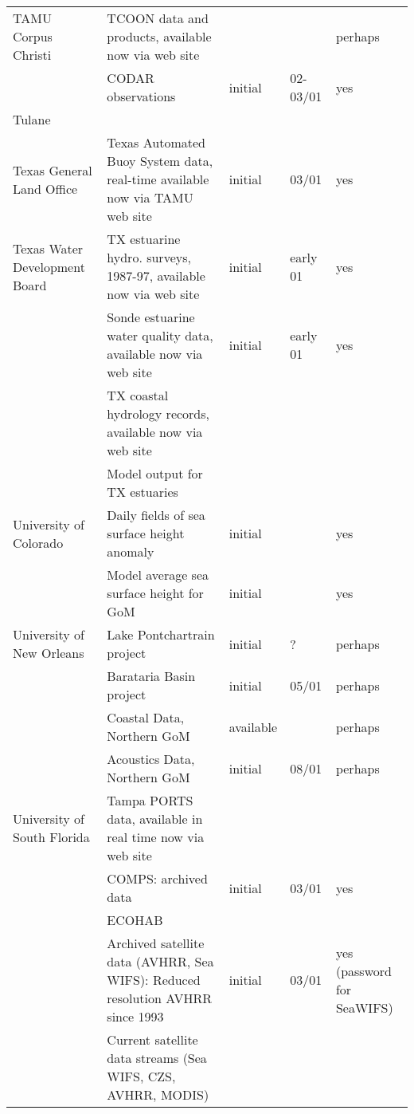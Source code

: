 \begin{longtable}{|p{0.75in}|p{2.75in}|p{0.5in}|p{0.5in}|p{0.5in}|}
TAMU Corpus Christi &  TCOON data and products,
      available now via web site & & & perhaps \\
&             CODAR observations   &          initial &     02-03/01 &
      yes \\ \hline

Tulane & & & & \\ \hline

Texas General 
Land Office    
&
Texas Automated Buoy System  data, real-time available 
                now via TAMU web site

& initial  &     03/01 &    yes \\ \hline

Texas Water Development Board
&
  TX estuarine hydro. surveys,   
    1987-97, available now via 
          web site 
& initial &     early 01  & yes \\ 
&             Sonde estuarine water quality 
               data, available  now via web 
               site 
& initial &     early 01  & yes \\ 
&             TX coastal hydrology records, 
               available now via web site & & & \\
&             Model output for TX estuaries & & & \\ \hline
University of Colorado  &  Daily fields of sea surface   
    height anomaly & initial & & yes \\
&             Model average sea surface height for GoM & initial & &
yes \\ \hline
               

University   
of New       
Orleans &     
Lake Pontchartrain project  &   initial  &     ?    & perhaps \\             
&Barataria Basin project   &     initial  &    05/01 &    perhaps \\
&Coastal Data, Northern GoM &    available     &     &    perhaps \\
&Acoustics Data, Northern GoM  & initial  &    08/01    & perhaps \\ \hline


University   
of South       
Florida        
&
Tampa PORTS data, available    in real time now via web site & & & \\
&             COMPS:          
               archived data             &  initial    &  03/01 &   yes \\
&             ECOHAB & & & \\
&             Archived satellite data 
               (AVHRR, Sea WIFS):      
               Reduced resolution AVHRR
                 since 1993            
&       initial   &   03/01  &   yes (password for SeaWIFS) \\
&             Current satellite data 
               streams (Sea WIFS, CZS, 
               AVHRR, MODIS) & & & \\ \hline


\end{longtable}
